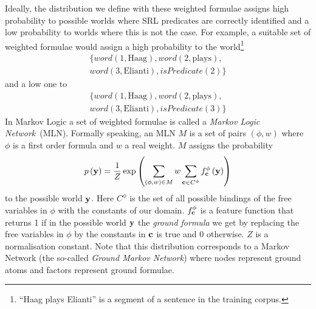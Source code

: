 Ideally, the distribution we define with these weighted formulae assigns high probability to possible worlds where SRL predicates are correctly identified and a low probability to worlds where this is not the case. For example, a suitable set of weighted formulae would assign a high probability to the world\footnote{``Haag plays Elianti'' is a segment of a sentence in the training corpus.}
\begin{eqnarray*}
 &\{ word\left(1,\text{Haag}\right),word(2,\text{plays}),\\
 & word(3,\text{Elianti}),isPredicate(2) \}& \end{eqnarray*}
and a low one to
\begin{eqnarray*}
& \{ word\left(1,\text{Haag}\right),word(2,\text{plays}),\\
 & word(3,\text{Elianti}),isPredicate(3) \} &\end{eqnarray*}
In Markov Logic a set of weighted formulae is called a \emph{Markov Logic Network}~(MLN). Formally speaking, an MLN $M$ is a set of pairs $\left(\phi,w\right)$ where $\phi$ is a first order formula and $w$ a real weight. $M$ assigns the probability
\begin{equation}
p\left(\mathbf{y}\right)=\frac{1}{Z}\exp\left(
\sum_{\left(\phi,w\right)\in M} w
\sum_{\mathbf{c}\in C^{\phi}}f_{\mathbf{c}}^{\phi}\left(\mathbf{y}\right)
\right)
\label{eq:prob}
\end{equation}
to the possible world $\mathbf{y}$.  Here $C^{\phi}$ is the set of all possible
bindings of the free variables in $\phi$ with the constants of our
domain. $f_{\mathbf{c}}^{\phi}$ is a feature function that returns 1
if in the possible world $\mathbf{y}$ the \emph{ground formula} we get by
replacing the free variables in $\phi$ by the constants in $\mathbf{c}$
is true and 0 otherwise. $Z$ is a normalisation constant. Note that
this distribution corresponds to a Markov Network (the so-called \emph{Ground
Markov Network}) where nodes represent ground atoms and factors represent
ground formulae.



